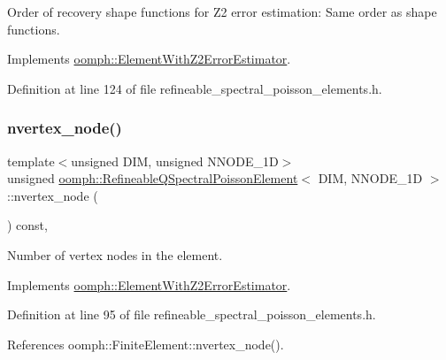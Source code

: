 Order of recovery shape functions for Z2 error estimation\+: Same order as shape functions. 



Implements \hyperlink{classoomph_1_1ElementWithZ2ErrorEstimator_af39480835bd3e0f6b2f4f7a9a4044798}{oomph\+::\+Element\+With\+Z2\+Error\+Estimator}.



Definition at line 124 of file refineable\+\_\+spectral\+\_\+poisson\+\_\+elements.\+h.

\mbox{\label{classoomph_1_1RefineableQSpectralPoissonElement_a10859fa076e489db05d21b30599edda9}} 
\subsubsection{\texorpdfstring{nvertex\+\_\+node()}{nvertex\_node()}}
{\footnotesize\ttfamily template$<$unsigned D\+IM, unsigned N\+N\+O\+D\+E\+\_\+1D$>$ \\
unsigned \hyperlink{classoomph_1_1RefineableQSpectralPoissonElement}{oomph\+::\+Refineable\+Q\+Spectral\+Poisson\+Element}$<$ D\+IM, N\+N\+O\+D\+E\+\_\+1D $>$\+::nvertex\+\_\+node (\begin{DoxyParamCaption}{ }\end{DoxyParamCaption}) const\hspace{0.3cm}{\ttfamily [inline]}, {\ttfamily [virtual]}}



Number of vertex nodes in the element. 



Implements \hyperlink{classoomph_1_1ElementWithZ2ErrorEstimator_a19495a0e77ef4ff35f15fdf7913b4077}{oomph\+::\+Element\+With\+Z2\+Error\+Estimator}.



Definition at line 95 of file refineable\+\_\+spectral\+\_\+poisson\+\_\+elements.\+h.



References oomph\+::\+Finite\+Element\+::nvertex\+\_\+node().

\mbox{\label{classoomph_1_1RefineableQSpectralPoissonElement_a42f1a9b5e69470d825f814e047526287}} 

